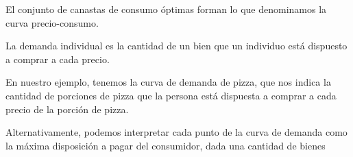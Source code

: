 \documentclass{beamer}
\begin{document}
\begin{frame}
    \begin{center}
      El conjunto de canastas de consumo óptimas forman lo que denominamos la curva precio-consumo.
    \end{center}
  \begin{boxB}
    \begin{center}
      La demanda individual es la cantidad de un bien que un individuo está dispuesto a comprar a cada precio.
    \end{center}
  \end{boxB}
  \begin{center}
    En nuestro ejemplo, tenemos la curva de demanda de pizza, que nos indica la cantidad de porciones de pizza que la persona está dispuesta a comprar a cada precio de la porción de pizza.
  \end{center}
  \begin{boxA}
    \begin{center}
      Alternativamente, podemos interpretar cada punto de la curva de demanda como la máxima disposición a pagar del consumidor, dada una cantidad de bienes
    \end{center}
  \end{boxA}
\end{frame}
\end{document}
